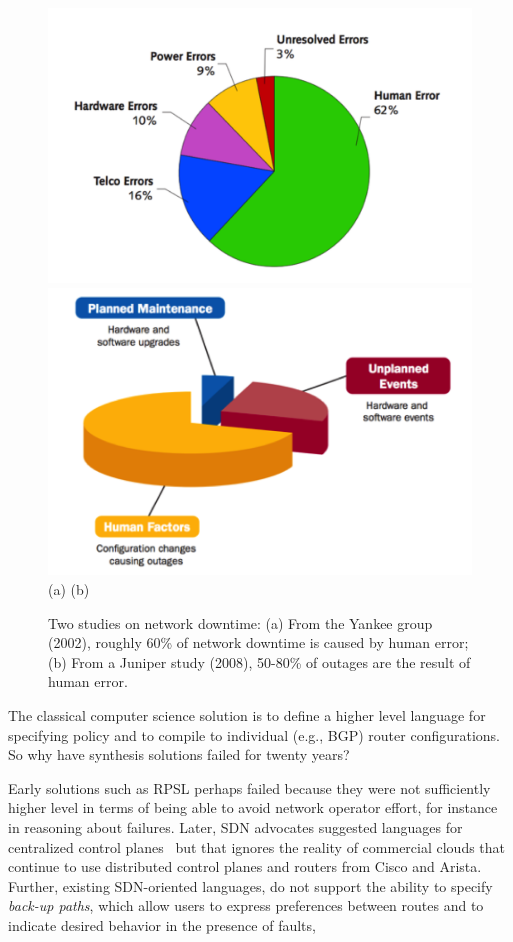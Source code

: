 \begin{figure}[t]
  \centering
  \includegraphics[width=.45\textwidth]{figures/errors1}
  \hspace{1cm}
  \includegraphics[width=.45\textwidth]{figures/errors2} \\
  (a)  \hspace{3in} (b)
  \caption{Two studies on network downtime:  (a) From the Yankee group (2002),
roughly 60\% of network downtime is caused by human error; (b) From a Juniper
study (2008), 50-80\% of outages are the result of human error.}
  \label{fig:network-downtime}
\end{figure}

The classical computer science solution is to define a higher level language for specifying policy and to compile to individual (e.g., BGP) router configurations.  So why have synthesis solutions failed for twenty years? 

Early solutions such as RPSL\cite{rpsl} perhaps failed because they were not sufficiently higher level in terms of being able to avoid network operator effort, for instance in reasoning about failures.    Later, SDN advocates suggested languages for centralized control planes~\cite{netkat,frenetic,srikant} but that ignores the reality of commercial clouds that continue to use distributed control planes and routers from Cisco and Arista.  Further, existing SDN-oriented languages, do not support the ability to specify \emph{back-up paths}, which allow users 
to express preferences between routes and to indicate desired behavior in the presence of faults,

